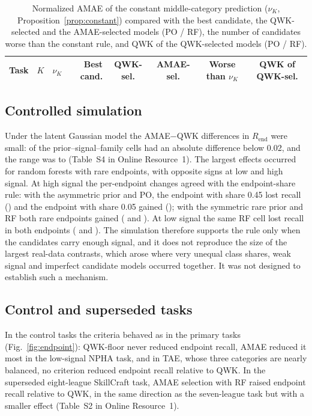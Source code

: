 \documentclass[pdflatex,sn-mathphys-ay]{sn-jnl}
\theoremstyle{thmstyleone}
\theoremstyle{thmstylethree}
\newcommand{\QWKF}{QWK-floor}
\begin{document}
\begin{table}[t]
\caption{Normalized AMAE of the constant middle-category prediction ($\nu_K$, Proposition~\ref{prop:constant}) compared with the best candidate, the QWK-selected and the AMAE-selected models (PO / RF), the number of candidates worse than the constant rule, and QWK of the QWK-selected models (PO / RF).}\label{tab:constant}
\centering\footnotesize
\begin{tabular}{@{}lrrrcccc@{}}
\toprule
Task & $K$ & $\nu_K$ & Best cand. & QWK-sel. & AMAE-sel. & Worse than $\nu_K$ & QWK of QWK-sel.\\
\midrule

\bottomrule
\end{tabular}
\end{table}

\subsection{Controlled simulation}\label{sec:res-sim}

Under the latent Gaussian model the AMAE$-$QWK differences in $R_{\mathrm{end}}$ were small: \SimAmaeAbsSmall{} of the \SimCells{} prior--signal--family cells had an absolute difference below 0.02, and the range was \SimAmaeMin{} to \SimAmaeMax{} (Table~S4 in Online Resource~1). The largest effects occurred for random forests with rare endpoints, with opposite signs at low and high signal. At high signal the per-endpoint changes agreed with the endpoint-share rule: with the asymmetric prior and PO, the endpoint with share 0.45 lost recall (\SimAsymPoLow{}) and the endpoint with share 0.05 gained (\SimAsymPoHigh{}); with the symmetric rare prior and RF both rare endpoints gained (\SimSymHiRfLow{} and \SimSymHiRfHigh{}). At low signal the same RF cell lost recall in both endpoints (\SimSymLoRfLow{} and \SimSymLoRfHigh{}). The simulation therefore supports the rule only when the candidates carry enough signal, and it does not reproduce the size of the largest real-data contrasts, which arose where very unequal class shares, weak signal and imperfect candidate models occurred together. It was not designed to establish such a mechanism.

\subsection{Control and superseded tasks}

In the control tasks the criteria behaved as in the primary tasks (Fig.~\ref{fig:endpoint}): \QWKF{} never reduced endpoint recall, AMAE reduced it most in the low-signal NPHA task, and in TAE, whose three categories are nearly balanced, no criterion reduced endpoint recall relative to QWK. In the superseded eight-league SkillCraft task, AMAE selection with RF raised endpoint recall relative to QWK, in the same direction as the seven-league task but with a smaller effect (Table~S2 in Online Resource~1).
\end{document}
